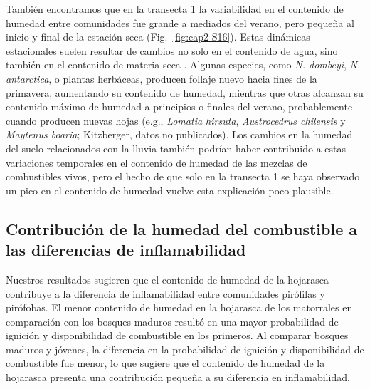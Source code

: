 También encontramos que en la transecta 1 la variabilidad en el contenido de humedad entre comunidades fue grande a mediados del verano, pero pequeña al inicio y final de la estación seca (Fig.~\ref{fig:cap2-S16}). Estas dinámicas estacionales suelen resultar de cambios no solo en el contenido de agua, sino también en el contenido de materia seca \citep{jolly_-coupling_2014, qi_spectroscopic_2014}. Algunas especies, como \textit{N. dombeyi}, \textit{N. antarctica}, o plantas herbáceas, producen follaje nuevo hacia fines de la primavera, aumentando su contenido de humedad, mientras que otras alcanzan su contenido máximo de humedad a principios o finales del verano, probablemente cuando producen nuevas hojas (e.g., \textit{Lomatia hirsuta}, \textit{Austrocedrus chilensis} y \textit{Maytenus boaria}; Kitzberger, datos no publicados). Los cambios en la humedad del suelo relacionados con la lluvia también podrían haber contribuido a estas variaciones temporales en el contenido de humedad de las mezclas de combustibles vivos, pero el hecho de que solo en la transecta 1 se haya observado un pico en el contenido de humedad vuelve esta explicación poco plausible.

\subsection{Contribución de la humedad del combustible a las diferencias de inflamabilidad}

Nuestros resultados sugieren que el contenido de humedad de la hojarasca contribuye a la diferencia de inflamabilidad entre comunidades pirófilas y pirófobas. El menor contenido de humedad en la hojarasca de los matorrales en comparación con los bosques maduros resultó en una mayor probabilidad de ignición y disponibilidad de combustible en los primeros. Al comparar bosques maduros y jóvenes, la diferencia en la probabilidad de ignición y disponibilidad de combustible fue menor, lo que sugiere que el contenido de humedad de la hojarasca presenta una contribución pequeña a su diferencia en inflamabilidad.

